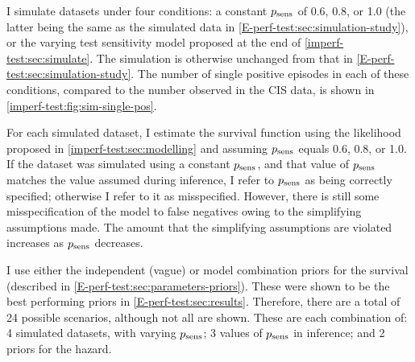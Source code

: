 \documentclass[thesis.tex]{subfiles}
\begin{document}
I simulate datasets under four conditions: a constant $p_\text{sens}$ of 0.6, 0.8, or 1.0 (the latter being the same as the simulated data in \cref{E-perf-test:sec:simulation-study}), or the varying test sensitivity model proposed at the end of \cref{imperf-test:sec:simulate}.
The simulation is otherwise unchanged from that in \cref{E-perf-test:sec:simulation-study}.
The number of single positive episodes in each of these conditions, compared to the number observed in the CIS data, is shown in \cref{imperf-test:fig:sim-single-pos}.

For each simulated dataset, I estimate the survival function using the likelihood proposed in \cref{imperf-test:sec:modelling} and assuming $p_\text{sens}$ equals 0.6, 0.8, or 1.0.
If the dataset was simulated using a constant $p_\text{sens}$, and that value of $p_\text{sens}$ matches the value assumed during inference, I refer to $p_\text{sens}$ as being correctly specified; otherwise I refer to it as misspecified.
However, there is still some misspecification of the model to false negatives owing to the simplifying assumptions made.
The amount that the simplifying assumptions are violated increases as $p_\text{sens}$ decreases.

I use either the independent (vague) or model combination priors for the survival (described in \cref{E-perf-test:sec:parameters-priors}).
These were shown to be the best performing priors in \cref{E-perf-test:sec:results}.
Therefore, there are a total of 24 possible scenarios, although not all are shown.
These are each combination of: 4 simulated datasets, with varying $p_\text{sens}$; 3 values of $p_\text{sens}$ in inference; and 2 priors for the hazard.
\end{document}
